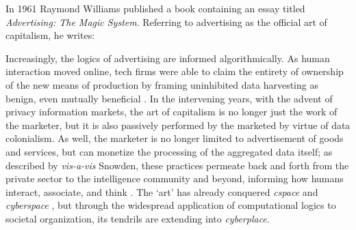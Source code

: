 In 1961 Raymond Williams published a book containing an essay
titled \emph{Advertising: The Magic System}. Referring to advertising
as the official art of capitalism, he writes: \newline


\newline

Increasingly, the logics of advertising are informed
algorithmically. As human interaction moved online, tech firms were
able to claim the entirety of ownership of the new means of production
by framing uninhibited data harvesting as benign, even mutually
beneficial \citep{burrell2021SocietyAlgorithms}. In the intervening
years, with the advent of privacy information markets, the art of
capitalism is no longer just the work of the marketer, but it is also
passively performed by the marketed by virtue of data colonialism. As
well, the marketer is no longer limited to advertisement of goods and
services, but can monetize the processing of the aggregated data itself; as
described by \cite{crampton2015CollectIt}
\emph{vis-a-vis} Snowden, these practices permeate back and forth from the
private sector to the intelligence community and beyond, informing how
humans interact, associate, and
think \citep{burrell2021SocietyAlgorithms}. The `art' has already
conquered \emph{cspace} and \emph{cyberspace} \citep{batty1997VirtualGeography}, but
through the widespread application of computational logics to societal
organization, its tendrils are extending into \emph{cyberplace}.

